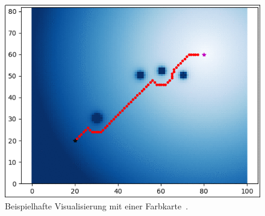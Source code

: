 \begin{figure}
  \centering
  \includegraphics[width=0.7\linewidth, height=0.7\linewidth]{img/pythonrobotics}
  \caption{Beispielhafte Visualisierung mit einer Farbkarte~\cite{PythonRobotics}.}
  \label{fig:pyrob}
\end{figure}


